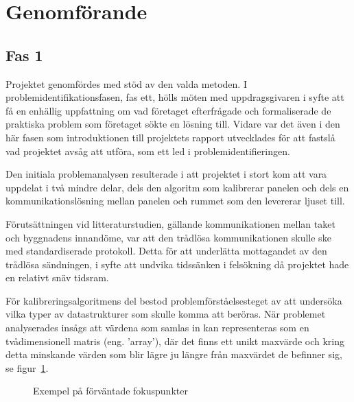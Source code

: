 \section{Genomförande} %
\label{sec:genomf_rande}
    \subsection{Fas 1} %
    \label{sub:steg_1}
        Projektet genomfördes med stöd av den valda metoden. I problemidentifikationsfasen, fas ett, hölls möten med uppdragsgivaren i syfte att få en enhällig uppfattning om vad företaget efterfrågade och formaliserade de praktiska problem som företaget sökte en lösning till. Vidare var det även i den här fasen som introduktionen till projektets rapport utvecklades för att fastslå vad projektet avsåg att utföra, som ett led i problemidentifieringen. \bigskip

        Den initiala problemanalysen resulterade i att projektet i stort kom att vara uppdelat i två mindre delar, dels den algoritm som kalibrerar panelen och dels en kommunikationslösning mellan panelen och rummet som den levererar ljuset till. \bigskip

        Förutsättningen vid litteraturstudien, gällande kommunikationen mellan taket och byggnadens innandöme, var att den trådlösa kommunikationen skulle ske med standardiserade protokoll. Detta för att underlätta mottagandet av den trådlösa sändningen, i syfte att undvika tidssänken i felsökning då projektet hade en relativt snäv tidsram.\bigskip

        För kalibreringsalgoritmens del bestod problemförståelsesteget av att undersöka vilka typer av datastrukturer som skulle komma att beröras. När problemet analyserades insågs att värdena som samlas in kan representeras som en tvådimensionell matris (eng. 'array'), där det finns ett unikt maxvärde och kring detta minskande värden som blir lägre ju längre från maxvärdet de befinner sig, se figur~\ref{fig:array}. \bigskip

        \begin{figure}[hbt]
        \centering
            \begin{subfigure}{0.2\textwidth}
            \end{subfigure}
            \begin{subfigure}{0.2\textwidth}
            \end{subfigure}
        \caption{\label{fig:array} Exempel på förväntade fokuspunkter}
        \end{figure}


